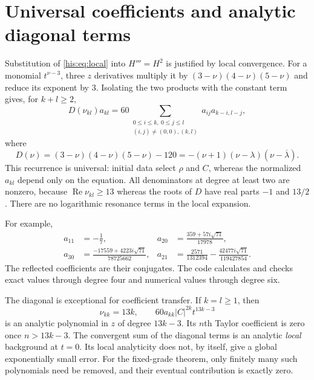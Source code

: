\documentclass[11pt]{article}
\theoremstyle{remark}\newtheorem{remark}[theorem]{Remark}
\DeclareMathOperator{\Rea}{Re}
\newcommand{\la}{\lambda}
\newcommand{\lab}{{\overline{\lambda}}}
\numberwithin{equation}{section}
\begin{document}
\section{Universal coefficients and analytic diagonal terms}\label{his:sec:coeffs}
Substitution of \eqref{his:eq:local} into $H'''=H^2$ is justified by local convergence. For a monomial $t^{\nu-3}$, three $z$ derivatives multiply it by
$(3-\nu)(4-\nu)(5-\nu)$ and reduce its exponent by $3$. Isolating the two products with the constant term gives, for $k+l\ge2$,
\begin{equation}\label{his:eq:akl}
 D(\nu_{kl})a_{kl}
 =60\!\sum_{\substack{0\le i\le k,\ 0\le j\le l\\
                   (i,j)\ne(0,0),(k,l)}}a_{ij}a_{k-i,l-j},
\end{equation}
where
\begin{equation}\label{his:eq:D}
 D(\nu)=(3-\nu)(4-\nu)(5-\nu)-120
       =-(\nu+1)(\nu-\la)(\nu-\lab).
\end{equation}
This recurrence is universal: initial data select $\rho$ and $C$, whereas the normalized $a_{kl}$ depend only on the equation. All denominators at degree at least two are nonzero, because $\Rea\nu_{kl}\ge13$ whereas the roots of $D$ have real parts $-1$ and $13/2$. There are no logarithmic resonance terms in the local expansion.

For example,
\begin{align}
 a_{11}&=-\frac17,&
 a_{20}&=\frac{359+57i\sqrt{71}}{17978},\label{his:eq:first-coeffs}\\
 a_{30}&=\frac{-17559+4223i\sqrt{71}}{78725662},&
 a_{21}&=\frac{2571}{1312394}
           -\frac{42477i\sqrt{71}}{119427854}.\nonumber
\end{align}
The reflected coefficients are their conjugates. The code calculates and checks exact values through degree four and numerical values through degree six.

The diagonal is exceptional for coefficient transfer. If $k=l\ge1$, then
\begin{equation}\label{his:eq:diagonal}
 \nu_{kk}=13k,\qquad
 60a_{kk}|C|^{2k}t^{13k-3}
\end{equation}
is an analytic polynomial in $z$ of degree $13k-3$. Its $n$th Taylor coefficient is zero once $n>13k-3$. The convergent sum of the diagonal terms is an analytic \emph{local} background at $t=0$. Its local analyticity does not, by itself, give a global exponentially small error. For the fixed-grade theorem, only finitely many such polynomials need be removed, and their eventual contribution is exactly zero.
\end{document}
